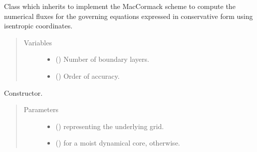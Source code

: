 \documentclass[letterpaper,10pt,english]{sphinxmanual}
\begin{document}
\begin{fulllineitems}
\label{\detokenize{api:tasmania.dycore.flux_isentropic_maccormack.FluxIsentropicMacCormack}}
Class which inherits {\hyperref[\detokenize{api:tasmania.dycore.flux_isentropic.FluxIsentropic}]{}} to implement the MacCormack scheme to compute
the numerical fluxes for the governing equations expressed in conservative form using isentropic coordinates.
\begin{quote}\begin{description}
\item[{Variables}] \leavevmode\begin{itemize}
\item {} 
{\hyperref[\detokenize{api:tasmania.dycore.prognostic_isentropic.PrognosticIsentropic.nb}]{}} () \textendash{} Number of boundary layers.

\item {} 
 () \textendash{} Order of accuracy.

\end{itemize}

\end{description}\end{quote}

\begin{fulllineitems}
\label{\detokenize{api:tasmania.dycore.flux_isentropic_maccormack.FluxIsentropicMacCormack.__init__}}
Constructor.
\begin{quote}\begin{description}
\item[{Parameters}] \leavevmode\begin{itemize}
\item {} 
 () \textendash{} {\hyperref[\detokenize{api:tasmania.grids.grid_xyz.GridXYZ}]{}} representing the underlying grid.

\item {} 
 () \textendash{}  for a moist dynamical core,  otherwise.


\end{itemize}
\end{description}
\end{quote}
\end{fulllineitems}
\end{fulllineitems}
\end{document}
